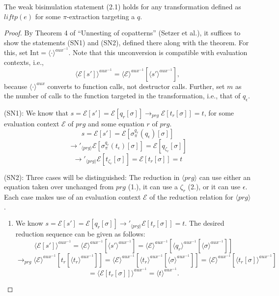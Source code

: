 \begin{proposition}
The weak bisimulation statement (2.1) holds for any transformation defined as $liftp(e)$ for some $\pi$-extraction targeting a $q$.

\begin{proof}
By Theorem 4 of ``Unnesting of copatterns'' (Setzer et al.), it suffices to show the statements (SN1) and (SN2), defined there along with the theorem. For this, set $\textrm{Int} = \langle \cdot \rangle^{aux^{-1}}$. Note that this unconversion is compatible with evaluation contexts, i.e.,
\[
\langle \mathcal{E}[s'] \rangle^{aux^{-1}} = \langle \mathcal{E} \rangle^{aux^{-1}}[\langle s' \rangle^{aux^{-1}}],
\]
because $\langle \cdot \rangle^{aux}$ converts to function calls, not destructor calls.
Further, set $m$ as the number of calls to the function targeted in the transformation, i.e., that of $q_\epsilon$.

(SN1): We know that $s = \mathcal{E}[s'] = \mathcal{E}[q_r[\sigma]] \longrightarrow_{prg} \mathcal{E}[t_r[\sigma]] = t$, for some evaluation context $\mathcal{E}$ of $prg$ and some equation $r$ of $prg$.
\[
s = \mathcal{E}[s'] = \mathcal{E}[\sigma^{q_r}_\pi(q_\epsilon)[\sigma]]
\]
\[
\longrightarrow'_{\langle prg \rangle} \mathcal{E}[\sigma^{q_r}_\pi(t_\epsilon)[\sigma]] = \mathcal{E}[q_{\zeta_r}[\sigma]]
\]
\[
\longrightarrow'_{\langle prg \rangle} \mathcal{E}[t_{\zeta_r}[\sigma]] = \mathcal{E}[t_r[\sigma]] = t
\]

(SN2): Three cases will be distinguished: The reduction in $\langle prg \rangle$ can use either an equation taken over unchanged from $prg$ (1.), it can use a $\zeta_r$ (2.), or it can use $\epsilon$. Each case makes use of an evaluation context $\mathcal{E}$ of the reduction relation for $\langle prg \rangle$.
\begin{enumerate}
\item We know $s = \mathcal{E}[s'] = \mathcal{E}[q_r[\sigma]] \longrightarrow'_{\langle prg \rangle} \mathcal{E}[t_r[\sigma]] = t$. The desired reduction sequence can be given as follows:
\[
\langle \mathcal{E}[s'] \rangle^{aux^{-1}} = \langle \mathcal{E} \rangle^{aux^{-1}}[\langle s' \rangle^{aux^{-1}}] = \langle \mathcal{E} \rangle^{aux^{-1}}[\langle q_r \rangle^{aux^{-1}}[\langle \sigma \rangle^{aux^{-1}}]]
\]
\[
 \longrightarrow_{prg} \langle \mathcal{E} \rangle^{aux^{-1}}[t_r[\langle t_r \rangle^{aux^{-1}}]] = \langle \mathcal{E} \rangle^{aux^{-1}}[\langle t_r \rangle^{aux^{-1}}[\langle \sigma \rangle^{aux^{-1}}]] = \langle \mathcal{E} \rangle^{aux^{-1}}[\langle t_r[\sigma] \rangle^{aux^{-1}}]
\]
\[
= \langle \mathcal{E}[t_r[\sigma]] \rangle^{aux^{-1}} = \langle t \rangle^{aux^{-1}}.
\]


\end{enumerate}
\end{proof}
\end{proposition}
